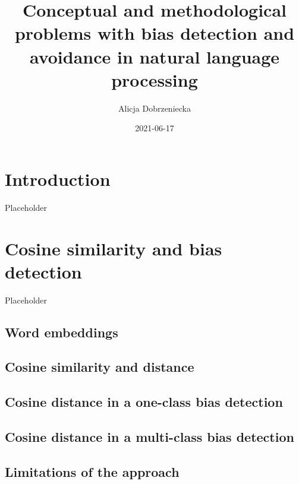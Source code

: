 \documentclass[
  12pt,
]{book}
\title{Conceptual and methodological problems with bias detection and avoidance in natural language processing}
\author{Alicja Dobrzeniecka}
\date{2021-06-17}
\begin{document}
\maketitle

{
\setcounter{tocdepth}{5}
\tableofcontents
}
\hypertarget{introduction}{%
\chapter{Introduction}\label{introduction}}

Placeholder

\hypertarget{cosine-similarity-and-bias-detection}{%
\chapter{Cosine similarity and bias detection}\label{cosine-similarity-and-bias-detection}}

Placeholder

\hypertarget{word-embeddings}{%
\section{Word embeddings}\label{word-embeddings}}

\hypertarget{cosine-similarity-and-distance}{%
\section{Cosine similarity and distance}\label{cosine-similarity-and-distance}}

\hypertarget{cosine-distance-in-a-one-class-bias-detection}{%
\section{Cosine distance in a one-class bias detection}\label{cosine-distance-in-a-one-class-bias-detection}}

\hypertarget{cosine-distance-in-a-multi-class-bias-detection}{%
\section{Cosine distance in a multi-class bias detection}\label{cosine-distance-in-a-multi-class-bias-detection}}

\hypertarget{limitations-of-the-approach}{%
\section{Limitations of the approach}\label{limitations-of-the-approach}}
\end{document}
